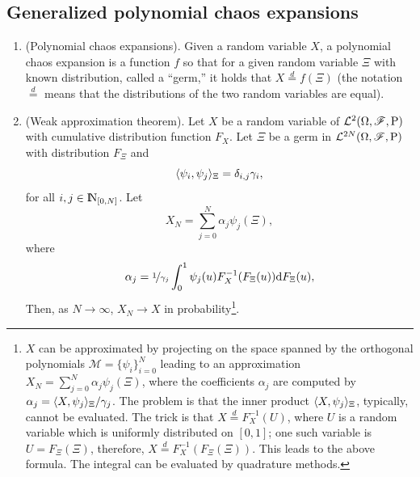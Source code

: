 \documentclass[a4paper,10pt]{article}
\begin{document}
\subsection{Generalized polynomial chaos expansions}
\begin{enumerate}
 \item (Polynomial chaos expansions). Given a random variable \(X\), a polynomial chaos expansion 
       is a function \(f\) so that for a given random variable \(\Xi\) with known distribution, 
       called a ``germ,'' it holds that \(X \overset{d}{=} f(\Xi)\) (the notation \(\overset{d}{=}\)
       means that the distributions of the two random variables are equal).
 \item (Weak approximation theorem). Let \(X\) be a random variable of \(\mathcal{L}^2(\Omega,\mathscr{F},\mathrm{P})\) with 
       cumulative distribution function \(F_X\). Let \(\Xi\) be a germ in \(\mathcal{L}^{2N}(\Omega,\mathscr{F},\mathrm{P})\)
       with distribution \(F_\Xi\) and 
       \[
        \langle\psi_i, \psi_j\rangle_\Xi = \delta_{i,j}\gamma_i,
       \]
       for all \(i,j\in\N_{[0,N]}\). Let
       \[
        X_N = \sum_{j=0}^{N}\alpha_j \psi_j(\Xi),
       \]
       where 
       \[
        \alpha_j = \nicefrac{1}{\gamma_j} \int_0^1 \psi_j(u) F_{X}^{-1}(F_{\Xi}(u)) \mathrm{d} F_{\Xi}(u),
       \]
       Then, as \(N\to\infty\), \(X_N\to X\) in probability\footnote{%
	      \(X\) can be approximated by projecting on the space spanned by the 
	      orthogonal polynomials \(\mathcal{M} = \{\psi_i\}_{i=0}^{N}\) leading
	      to an approximation \(X_N = \sum_{j=0}^{N} \alpha_j \psi_j(\Xi)\), where
	      the coefficients \(\alpha_j\) are computed by \(\alpha_j {}={} \langle X, \psi_j\rangle_\Xi/\gamma_j\).
	      The problem is that the inner product \(\langle X, \psi_j\rangle_\Xi\), typically, cannot be 
	      evaluated.
	      The trick is that \(X \overset{d}{=} F_X^{-1}(U)\), where \(U\) is a random variable
	      which is uniformly distributed on \([0,1]\); one such variable is \(U=F_{\Xi}(\Xi)\), 
	      therefore, \(X \overset{d}{=} F_{X}^{-1}(F_{\Xi}(\Xi))\). This leads to the above formula.
	      The integral can be evaluated by quadrature methods.
       }.


\end{enumerate}
\end{document}
